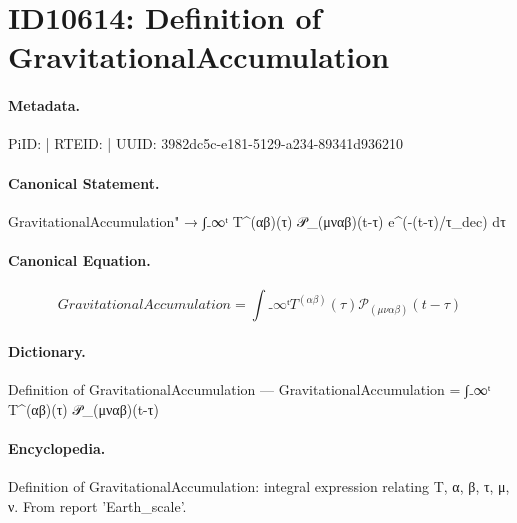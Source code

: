 \section*{ID10614: Definition of GravitationalAccumulation}
\paragraph{Metadata.}
PiID:  | RTEID:  | UUID: 3982dc5c-e181-5129-a234-89341d936210

\paragraph{Canonical Statement.}
GravitationalAccumulation" → ∫₋∞ᵗ T\textasciicircum{}(αβ)(τ) 𝒫\_(μναβ)(t-τ) e\textasciicircum{}(-(t-τ)/τ\_dec) dτ

\paragraph{Canonical Equation.}
\[
GravitationalAccumulation = ∫₋∞ᵗ T^(αβ)(τ) 𝒫_(μναβ)(t-τ)
\]

\paragraph{Dictionary.}
Definition of GravitationalAccumulation — GravitationalAccumulation = ∫₋∞ᵗ T\textasciicircum{}(αβ)(τ) 𝒫\_(μναβ)(t-τ)

\paragraph{Encyclopedia.}
Definition of GravitationalAccumulation: integral expression relating T, α, β, τ, μ, ν. From report 'Earth\_scale'.

